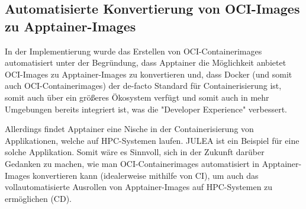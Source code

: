 \subsection{Automatisierte Konvertierung von OCI-Images zu Apptainer-Images}

In der Implementierung wurde das Erstellen von OCI-Containerimages automatisiert unter der Begründung, dass Apptainer die Möglichkeit anbietet OCI-Images zu Apptainer-Images zu konvertieren und, dass Docker (und somit auch OCI-Containerimages) der de-facto Standard für Containerisierung ist, somit auch über ein größeres Ökosystem verfügt und somit auch in mehr Umgebungen bereits integriert ist, was die "Developer Experience" verbessert.

Allerdings findet Apptainer eine Nische in der Containerisierung von Applikationen, welche auf HPC-Systemen laufen. JULEA ist ein Beispiel für eine solche Applikation. Somit wäre es Sinnvoll, sich in der Zukunft darüber Gedanken zu machen, wie man OCI-Containerimages automatisiert in Apptainer-Images konvertieren kann (idealerweise mithilfe von CI), um auch das vollautomatisierte Ausrollen von Apptainer-Images auf HPC-Systemen zu ermöglichen (CD).



